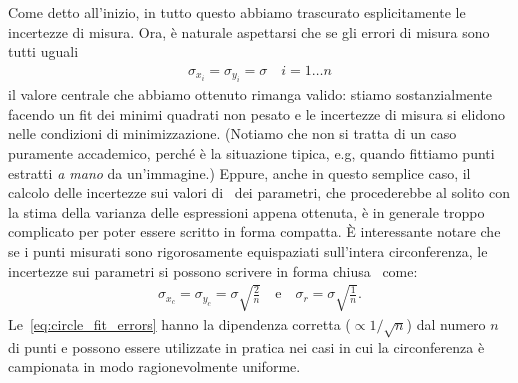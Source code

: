 
Come detto all'inizio, in tutto questo abbiamo trascurato esplicitamente le
incertezze di misura. Ora, è naturale aspettarsi che se gli errori di misura
sono tutti uguali
\begin{align*}
  \sigma_{x_i} = \sigma_{y_i} = \sigma \quad i = 1\ldots n
\end{align*}
il valore centrale che abbiamo ottenuto rimanga valido: stiamo sostanzialmente
facendo un fit dei minimi quadrati non pesato e le incertezze di misura si elidono
nelle condizioni di minimizzazione. (Notiamo che non si tratta di un caso puramente
accademico, perché è la situazione tipica, e.g, quando fittiamo punti estratti
\emph{a mano} da un'immagine.) Eppure, anche in questo semplice caso,
il calcolo delle incertezze sui valori di \bestfit\ dei parametri, che
procederebbe al solito con la stima della varianza delle espressioni appena
ottenuta, è in generale troppo complicato per poter essere scritto in forma
compatta. \`E interessante notare che se i punti misurati sono rigorosamente
equispaziati sull'intera circonferenza, le incertezze sui parametri
si possono scrivere in forma chiusa~\cite{Kasa1976ACF} come:
\begin{align}\label{eq:circle_fit_errors}
  \sigma_{x_c} = \sigma_{y_c} = \sigma \sqrt{\frac{2}{n}}
  \quad \text{e} \quad
  \sigma_r = \sigma \sqrt{\frac{1}{n}}.
\end{align}
Le~\eqref{eq:circle_fit_errors} hanno la dipendenza corretta ($\propto 1/\sqrt{n}$) dal
numero $n$ di punti e possono essere utilizzate in pratica nei casi in cui
la circonferenza è campionata in modo ragionevolmente uniforme.


\summary

